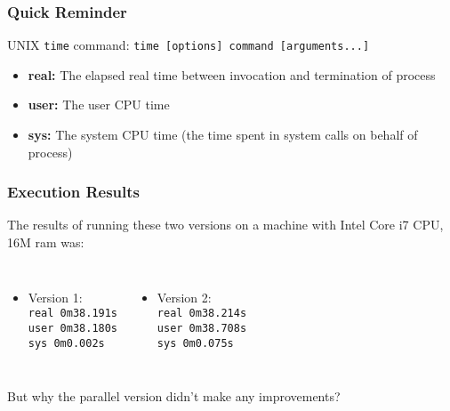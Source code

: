\documentclass[aspectratio=43,11pt]{beamer}
\begin{document}
\begin{frame}
  \frametitle{Quick Reminder}
  
  UNIX {\tt time} command: {\tt time [options] command [arguments...]}
  \begin{itemize}
    \item \textbf{real:} The elapsed real time between invocation and termination of process
    \item \textbf{user:} The user CPU time
    \item \textbf{sys:} The system CPU time (the time spent in system calls on behalf of process)
  \end{itemize}
\end{frame}
\begin{frame}
  \frametitle{Execution Results}

  The results of running these two versions on a machine with
  Intel Core i7 CPU, 16M ram was:
  \begin{columns}
  \begin{itemize}
    \item Version 1: \\
    {\tt real 0m38.191s \\
         user 0m38.180s \\
         sys  0m0.002s}  
  \end{itemize}
  \begin{itemize}
    \item Version 2: \\
    {\tt real 0m38.214s \\
         user 0m38.708s \\
         sys  0m0.075s}  
  \end{itemize}
  \end{columns}
  \vfill
  But why the parallel version didn't make any improvements?  
\end{frame}
\end{document}

